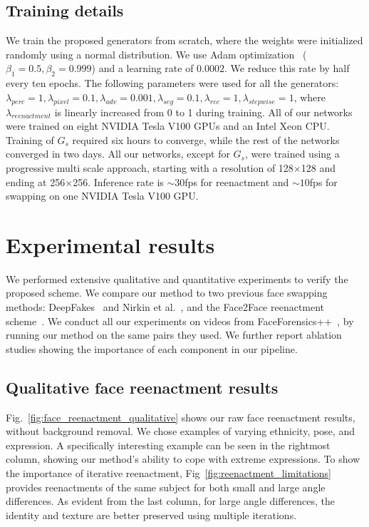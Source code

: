 \subsection{Training details}%
We train the proposed generators from scratch, where the weights were initialized randomly using a normal distribution. We use Adam optimization~\cite{kingma2014adam} ($\beta_{1}=0.5,\beta_{2}=0.999$) and a learning rate of $0.0002$. We reduce this rate by half every ten epochs. The following parameters were used for all the generators: $\lambda_{perc}=1,\lambda_{pixel}=0.1,\lambda_{adv}=0.001,\lambda_{seg}=0.1,\lambda_{rec}=1,\lambda_{stepwise}=1$, where $\lambda_{reenactment}$ is linearly increased from 0 to 1 during training. All of our networks were trained on eight NVIDIA Tesla V100 GPUs and an Intel Xeon CPU. Training of $G_{s}$ required six hours to converge, while the rest of the networks converged in two days. All our networks, except for $G_{s}$, were trained using a progressive multi scale approach, starting with a resolution of 128$\times$128 and ending at 256$\times$256. Inference rate is ${\sim}30$fps for reenactment and ${\sim}10$fps for swapping on one NVIDIA Tesla V100 GPU.

\section{Experimental results}
We performed extensive qualitative and quantitative experiments to verify the proposed scheme. We compare our method to two previous face swapping methods: DeepFakes~\cite{DeepFakes} and Nirkin et al.~\cite{nirkin2018face}, and the Face2Face reenactment scheme~\cite{thies2016face2face}. We conduct all our experiments on videos from FaceForensics++~\cite{roessler2019faceforensics++}, by running our method on the same pairs they used. We further report ablation studies showing the importance of each component in our pipeline.

\subsection{Qualitative face reenactment results}
Fig.~\ref{fig:face_reenactment_qualitative} shows our raw face reenactment results, without background removal. We chose examples of varying ethnicity, pose, and expression. A specifically interesting example can be seen in the rightmost column, showing our method's ability to cope with extreme expressions. To show the importance of iterative reenactment, Fig~\ref{fig:reenactment_limitations} provides reenactments of the same subject for both small and large angle differences. As evident from the last column, for large angle differences, the identity and texture are better preserved using multiple iterations. %

